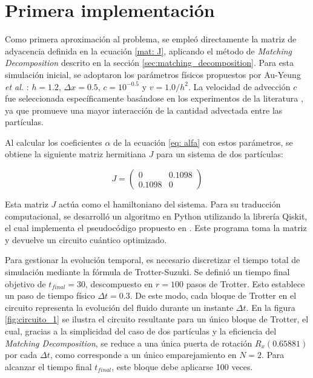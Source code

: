 \section{Primera implementación}
\label{sec:primera_implementacion}

Como primera aproximación al problema, se empleó directamente la matriz de adyacencia definida en la ecuación \ref{mat: J}, aplicando el método de \textit{Matching Decomposition} descrito en la sección \ref{sec:matching_decomposition}. Para esta simulación inicial, se adoptaron los parámetros físicos propuestos por Au-Yeung \textit{et al.} \cite{auyeung2025}: $h = 1.2$, $\Delta x = 0.5$, $c = 10^{-0.5}$ y $v = 1.0 / h^2$. La velocidad de advección $c$ fue seleccionada específicamente basándose en los experimentos de la literatura \cite{auyeung2025}, ya que promueve una mayor interacción de la cantidad advectada entre las partículas.

Al calcular los coeficientes $\alpha$ de la ecuación \ref{eq: alfa} con estos parámetros, se obtiene la siguiente matriz hermitiana $J$ para un sistema de dos partículas:

\begin{equation}
    J = 
    \begin{pmatrix}
    0 & 0.1098 \\
    0.1098 & 0
    \end{pmatrix}
    \label{mat: J_classical}
\end{equation}

Esta matriz $J$ actúa como el hamiltoniano del sistema. Para su traducción computacional, se desarrolló un algoritmo en Python utilizando la librería Qiskit, el cual implementa el pseudocódigo propuesto en \cite{matching2026}. Este programa toma la matriz y devuelve un circuito cuántico optimizado. 

Para gestionar la evolución temporal, es necesario discretizar el tiempo total de simulación mediante la fórmula de Trotter-Suzuki. Se definió un tiempo final objetivo de $t_{final} = 30$, descompuesto en $r = 100$ pasos de Trotter. Esto establece un paso de tiempo físico $\Delta t = 0.3$. De este modo, cada bloque de Trotter en el circuito representa la evolución del fluido durante un instante $\Delta t$. En la figura \ref{fig:circuito_1} se ilustra el circuito resultante para un único bloque de Trotter, el cual, gracias a la simplicidad del caso de dos partículas y la eficiencia del \textit{Matching Decomposition}, se reduce a una única puerta de rotación $R_x(0.65881)$ por cada $\Delta t$, como corresponde a un único emparejamiento en $N=2$. Para alcanzar el tiempo final $t_{final}$, este bloque debe aplicarse 100 veces.

